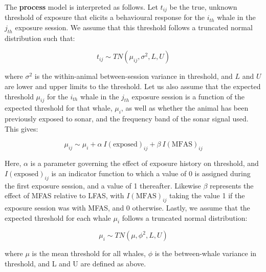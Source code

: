 \documentclass[
]{article}
\begin{document}
The \textbf{process} model is interpreted as follows. Let \(t_{ij}\) be the true, unknown threshold of exposure that elicits a behavioural response for the \(i_{th}\) whale in the \(j_{th}\) exposure session. We assume that this threshold follows a truncated normal distribution such that:

\begin{equation} 
  t_{ij}\sim TN(\mu_{ij}, \sigma^{2},L, U)
  \label{eq:tij}
\end{equation}

where \(\sigma^{2}\) is the within-animal between-session variance in threshold, and \(L\) and \(U\) are lower and upper limits to the threshold. Let us also assume that the expected threshold \(\mu_{ij}\) for the \(i_{th}\) whale in the \(j_{th}\) exposure session is a function of the expected threshold for that whale, \(\mu_{i}\), as well as whether the animal has been previously exposed to sonar, and the frequency band of the sonar signal used. This gives:

\begin{equation} 
 \mu_{ij}\sim \mu_{i} + \alpha \: I(\text{exposed})_{ij} + \beta \:I(\text{MFAS})_{ij}
  \label{eq:muij}
\end{equation}

Here, \(\alpha\) is a parameter governing the effect of exposure history on threshold, and \(I(\text{exposed})_{ij}\) is an indicator function to which a value of 0 is assigned during the first exposure session, and a value of 1 thereafter. Likewise \(\beta\) represents the effect of MFAS relative to LFAS, with \(I(\text{MFAS})_{ij}\) taking the value 1 if the exposure session was with MFAS, and 0 otherwise. Lastly, we assume that the expected threshold for each whale \(\mu_i\) follows a truncated normal distribution:

\begin{equation} 
 \mu_i \sim TN(\mu, \phi^2, L, U)
  \label{eq:mui}
\end{equation}

where \(\mu\) is the mean threshold for all whales, \(\phi\) is the between-whale variance in threshold, and L and U are defined as above.
\end{document}

